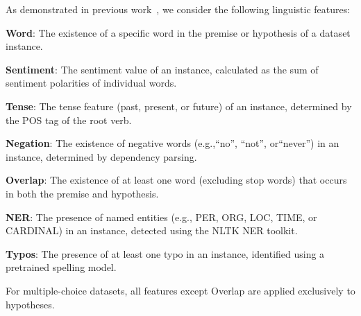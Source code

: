As demonstrated in previous work~\cite{naik2018stress,checklist2020acl}, 
we consider the following linguistic features: 

\indent\textbf{Word}: The existence of a specific word in the premise or hypothesis of a dataset instance.

\indent\textbf{Sentiment}: The sentiment value of an instance, calculated as the sum of sentiment polarities of individual words.

\indent\textbf{Tense}: The tense feature (past, present, or future) of an instance, determined by the POS tag of the root verb.

\indent\textbf{Negation}: The existence of negative words (e.g.,``no'', ``not'', or``never'') in an instance, determined by dependency parsing.

\indent\textbf{Overlap}: The existence of at least one word (excluding stop words) that occurs in both the premise and hypothesis.

\indent\textbf{NER}: The presence of named entities (e.g., PER, ORG, LOC, TIME, or CARDINAL) in an instance, detected using the NLTK NER toolkit.

\indent\textbf{Typos}: The presence of at least one typo in an instance, identified using a pretrained spelling model.

For multiple-choice datasets, all features except Overlap are applied exclusively to hypotheses.

